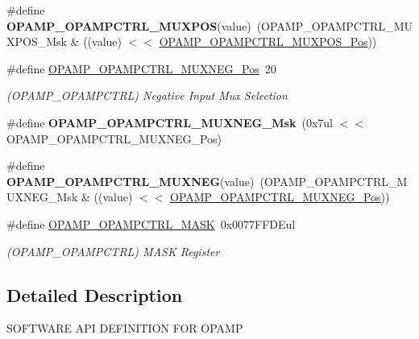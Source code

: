 \begin{DoxyCompactItemize}
\item 
\hypertarget{group___s_a_m_l21___o_p_a_m_p_ga1a6cc4dbdd1841ac4d2c180ce6ee75c1}{}\#define {\bfseries O\+P\+A\+M\+P\+\_\+\+O\+P\+A\+M\+P\+C\+T\+R\+L\+\_\+\+M\+U\+X\+P\+O\+S}(value)~(O\+P\+A\+M\+P\+\_\+\+O\+P\+A\+M\+P\+C\+T\+R\+L\+\_\+\+M\+U\+X\+P\+O\+S\+\_\+\+Msk \& ((value) $<$$<$ \hyperlink{group___s_a_m_l21___o_p_a_m_p_ga9505fc6cf5877486c9b730ecc53e0137}{O\+P\+A\+M\+P\+\_\+\+O\+P\+A\+M\+P\+C\+T\+R\+L\+\_\+\+M\+U\+X\+P\+O\+S\+\_\+\+Pos}))\label{group___s_a_m_l21___o_p_a_m_p_ga1a6cc4dbdd1841ac4d2c180ce6ee75c1}

\item 
\hypertarget{group___s_a_m_l21___o_p_a_m_p_gafa4ae36bfa1b0ceb07e0000a469409a2}{}\#define \hyperlink{group___s_a_m_l21___o_p_a_m_p_gafa4ae36bfa1b0ceb07e0000a469409a2}{O\+P\+A\+M\+P\+\_\+\+O\+P\+A\+M\+P\+C\+T\+R\+L\+\_\+\+M\+U\+X\+N\+E\+G\+\_\+\+Pos}~20\label{group___s_a_m_l21___o_p_a_m_p_gafa4ae36bfa1b0ceb07e0000a469409a2}

\begin{DoxyCompactList}\small\item\em (O\+P\+A\+M\+P\+\_\+\+O\+P\+A\+M\+P\+C\+T\+R\+L) Negative Input Mux Selection \end{DoxyCompactList}\item 
\hypertarget{group___s_a_m_l21___o_p_a_m_p_ga32c2c034188f27dc4e2dccdbd8f8390e}{}\#define {\bfseries O\+P\+A\+M\+P\+\_\+\+O\+P\+A\+M\+P\+C\+T\+R\+L\+\_\+\+M\+U\+X\+N\+E\+G\+\_\+\+Msk}~(0x7ul $<$$<$ O\+P\+A\+M\+P\+\_\+\+O\+P\+A\+M\+P\+C\+T\+R\+L\+\_\+\+M\+U\+X\+N\+E\+G\+\_\+\+Pos)\label{group___s_a_m_l21___o_p_a_m_p_ga32c2c034188f27dc4e2dccdbd8f8390e}

\item 
\hypertarget{group___s_a_m_l21___o_p_a_m_p_gabc334cee38d10ac4b270e5395088e133}{}\#define {\bfseries O\+P\+A\+M\+P\+\_\+\+O\+P\+A\+M\+P\+C\+T\+R\+L\+\_\+\+M\+U\+X\+N\+E\+G}(value)~(O\+P\+A\+M\+P\+\_\+\+O\+P\+A\+M\+P\+C\+T\+R\+L\+\_\+\+M\+U\+X\+N\+E\+G\+\_\+\+Msk \& ((value) $<$$<$ \hyperlink{group___s_a_m_l21___o_p_a_m_p_gafa4ae36bfa1b0ceb07e0000a469409a2}{O\+P\+A\+M\+P\+\_\+\+O\+P\+A\+M\+P\+C\+T\+R\+L\+\_\+\+M\+U\+X\+N\+E\+G\+\_\+\+Pos}))\label{group___s_a_m_l21___o_p_a_m_p_gabc334cee38d10ac4b270e5395088e133}

\item 
\hypertarget{group___s_a_m_l21___o_p_a_m_p_ga3db9d5ee4752656fcc4c14a41153b211}{}\#define \hyperlink{group___s_a_m_l21___o_p_a_m_p_ga3db9d5ee4752656fcc4c14a41153b211}{O\+P\+A\+M\+P\+\_\+\+O\+P\+A\+M\+P\+C\+T\+R\+L\+\_\+\+M\+A\+S\+K}~0x0077\+F\+F\+D\+Eul\label{group___s_a_m_l21___o_p_a_m_p_ga3db9d5ee4752656fcc4c14a41153b211}

\begin{DoxyCompactList}\small\item\em (O\+P\+A\+M\+P\+\_\+\+O\+P\+A\+M\+P\+C\+T\+R\+L) M\+A\+S\+K Register \end{DoxyCompactList}\end{DoxyCompactItemize}


\subsection{Detailed Description}
S\+O\+F\+T\+W\+A\+R\+E A\+P\+I D\+E\+F\+I\+N\+I\+T\+I\+O\+N F\+O\+R O\+P\+A\+M\+P 